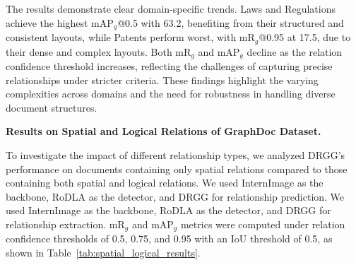 \begin{table}[ht]
\centering
\caption{{mAP$_g$ Results on different document domains of GraphDoc dataset.}}
\renewcommand{\arraystretch}{1.2}
\label{tab:mAPg_results}
\end{table}

{The results demonstrate clear domain-specific trends. Laws and Regulations achieve the highest mAP$_g$@0.5 with 63.2, benefiting from their structured and consistent layouts, while Patents perform worst, with mR$_g$@0.95 at 17.5, due to their dense and complex layouts. Both mR$_g$ and mAP$_g$ decline as the relation confidence threshold increases, reflecting the challenges of capturing precise relationships under stricter criteria. These findings highlight the varying complexities across domains and the need for robustness in handling diverse document structures.}

{\noindent \textbf{Results on Spatial and Logical Relations of GraphDoc Dataset.}}

{To investigate the impact of different relationship types, we analyzed DRGG’s performance on documents containing only spatial relations compared to those containing both spatial and logical relations. We used InternImage as the backbone, RoDLA as the detector, and DRGG for relationship prediction. We used InternImage as the backbone, RoDLA as the detector, and DRGG for relationship extraction. mR$_g$ and mAP$_g$ metrics were computed under relation confidence thresholds of 0.5, 0.75, and 0.95 with an IoU threshold of 0.5, as shown in Table~\ref{tab:spatial_logical_results}.}

